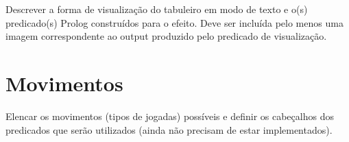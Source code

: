 \documentclass[a4paper]{article}
\begin{document}
Descrever a forma de visualização do tabuleiro em modo de texto e o(s) predicado(s) Prolog construídos para o efeito.
Deve ser incluída pelo menos uma imagem correspondente ao output produzido pelo predicado de visualização.


\section{Movimentos}

Elencar os movimentos (tipos de jogadas) possíveis e definir os cabeçalhos dos predicados que serão utilizados (ainda não precisam de estar implementados).
\end{document}
